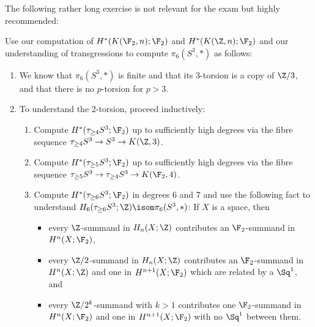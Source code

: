 The following rather long exercise is not relevant for the exam but highly recommended:
\begin{exercise}
	Use our computation of $H^*(K(\F_2, n); \F_2)$ and $H^*(K(\Z, n); \F_2)$ and our understanding of transgressions to compute $\pi_6(S^3, *)$ as follows:
	\begin{enumerate}
		\item We know that $\pi_6(S^3, *)$ is finite and that its 3-torsion is a copy of $\Zn{3}$, and that there is no $p$-torsion for $p > 3$.
		\item To understand the 2-torsion, proceed inductively:
			\begin{enumerate}
				\item Compute $H^*(\tau_{\geq 4} S^3; \F_2)$ up to sufficiently high degrees via the fibre sequence $\tau_{\geq 4} S^3 \to S^3 \to K(\Z, 3)$.
				\item Compute $H^*(\tau_{\geq 5} S^3; \F_2)$ up to sufficiently high degrees via the fibre sequence $\tau_{\geq 5} S^3 \to \tau_{\geq 4} S^3 \to K(\F_2, 4)$.
				\item Compute $H^*(\tau_{\geq 6} S^3; \F_2)$ in degrees 6 and 7 and use the following fact to understand $H_6(\tau_{\geq 6} S^3; \Z) \isom \pi_6(S^3, *)$:
					If $X$ is a space, then
					\begin{itemize}
						\item every $\Z$-summand in $H_n(X; \Z)$ contributes an $\F_2$-summand in $H^n(X; \F_2)$,
						\item every $\Zn{2}$-summand in $H_n(X; \Z)$ contributes an $\F_2$-summand in $H^n(X; \Z)$ and one in $H^{n + 1}(X; \F_2)$ which are related by a $\Sq^1$, and
						\item every $\Zn{2^k}$-summand with $k > 1$ contributes one $\F_2$-summand in $H^n(X; \F_2)$ and one in $H^{n + 1}(X; \F_2)$ with no $\Sq^1$ between them.
					\end{itemize}
			\end{enumerate}
	\end{enumerate}
\end{exercise}
